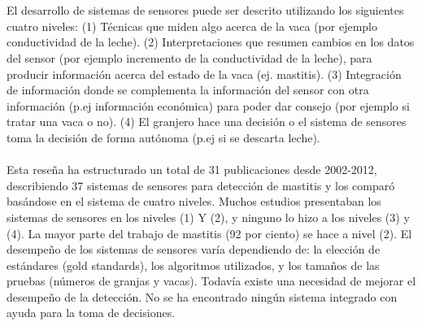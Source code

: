 \documentclass[a4paper, 11pt]{article}
\begin{document}
\section{\cite{2013}}
El desarrollo de sistemas de sensores puede ser descrito utilizando los siguientes cuatro niveles: (1) Técnicas que miden algo acerca de la vaca (por ejemplo conductividad de la leche). (2) Interpretaciones que resumen cambios en los datos del sensor (por ejemplo incremento de la conductividad de la leche), para producir información acerca del estado de la vaca (ej. mastitis). (3) Integración de información donde se complementa la información del sensor con otra información (p.ej información económica) para poder dar consejo (por ejemplo si tratar una vaca o no). (4) El granjero hace una decisión o el sistema de sensores toma la decisión de forma autónoma (p.ej si se descarta leche).\\\\
Esta reseña ha estructurado un total de 31 publicaciones desde 2002-2012, describiendo 37 sistemas de sensores para detección de mastitis y los comparó basándose en el sistema de cuatro niveles. Muchos estudios presentaban los sistemas de sensores en los niveles (1) Y (2), y ninguno lo hizo a los niveles (3) y (4). La mayor parte del trabajo de mastitis (92 por ciento) se hace a nivel (2). El desempeño de los sistemas de sensores varía dependiendo de: la elección de estándares (gold standards), los algoritmos utilizados, y los tamaños de las pruebas (números de granjas y vacas). Todavía existe una necesidad de mejorar el desempeño de la detección. No se ha encontrado ningún sistema integrado con ayuda para la toma de decisiones.
\end{document}
